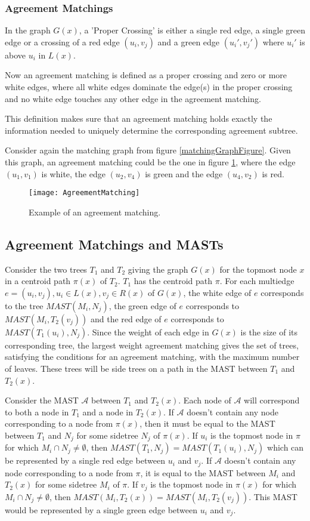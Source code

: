 \subsubsection{Agreement Matchings}
In the graph $G(x)$, a 'Proper Crossing' is either a single red edge, a single green edge or a crossing of a red edge $(u_i,v_j)$ and a green edge $(u_i',v_j')$ where $u_i'$ is above $u_i$ in $L(x)$.

Now an agreement matching is defined as a proper crossing and zero or more white edges, where all white edges dominate the edge(s) in the proper crossing and no white edge touches any other edge in the agreement matching.

This definition makes sure that an agreement matching holds exactly the information needed to uniquely determine the corresponding agreement subtree.

Consider again the matching graph from figure \ref{matchingGraphFigure}. Given this graph, an agreement matching could be the one in figure \ref{agreementMatchingFigure}, where the edge $(u_1,v_1)$ is white, the edge $(u_2,v_4)$ is green and the edge $(u_4,v_2)$ is red.

\begin{figure}
	\texttt{[image: AgreementMatching]}
	\caption{Example of an agreement matching.}
	\label{agreementMatchingFigure}
\end{figure}

\subsection{Agreement Matchings and MASTs}
Consider the two trees $T_1$ and $T_2$ giving the graph $G(x)$ for the topmost node $x$ in a centroid path $\pi(x)$ of $T_2$. $T_1$ has the centroid path $\pi$. For each multiedge $e = (u_i, v_j), u_i \in L(x), v_j \in R(x)$ of $G(x)$, the white edge of $e$ corresponds to the tree $MAST(M_i, N_j)$, the green edge of $e$ corresponds to $MAST(M_i, T_2(v_j))$ and the red edge of $e$ corresponds to $MAST(T_1(u_i), N_j)$. Since the weight of each edge in $G(x)$ is the size of its corresponding tree, the largest weight agreement matching gives the set of trees, satisfying the conditions for an agreement matching, with the maximum number of leaves. These trees will be side trees on a path in the MAST between $T_1$ and $T_2(x)$.

Consider the MAST $\mathcal{A}$ between $T_1$ and $T_2(x)$. Each node of $\mathcal{A}$ will correspond to both a node in $T_1$ and a node in $T_2(x)$. If $\mathcal{A}$ doesn't contain any node corresponding to a node from $\pi(x)$, then it must be equal to the MAST between $T_1$ and $N_j$ for some sidetree $N_j$ of $\pi(x)$. If $u_i$ is the topmost node in $\pi$ for which $M_i \cap N_j \ne \emptyset$, then $MAST(T_1, N_j) = MAST(T_1(u_i), N_j)$ which can be represented by a single red edge between $u_i$ and $v_j$. If $\mathcal{A}$ doesn't contain any node corresponding to a node from $\pi$, it is equal to the MAST between $M_i$ and $T_2(x)$ for some sidetree $M_i$ of $\pi$. If $v_j$ is the topmost node in $\pi(x)$ for which $M_i \cap N_j \ne \emptyset$, then $MAST(M_i, T_2(x)) = MAST(M_i, T_2(v_j))$. This MAST would be represented by a single green edge between $u_i$ and $v_j$.

